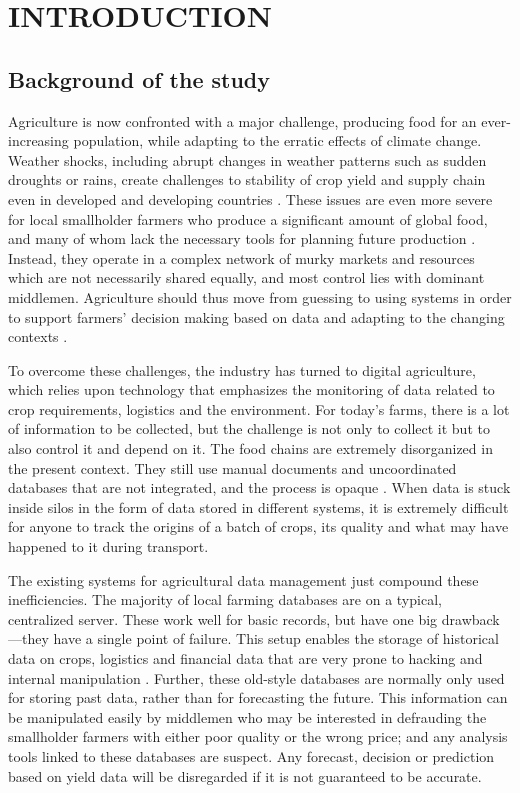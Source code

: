\chapter{INTRODUCTION}

\section{Background of the study}

Agriculture is now confronted with a major challenge, producing food for an ever-increasing population, while adapting to the erratic effects of climate change. Weather shocks, including abrupt changes in weather patterns such as sudden droughts or rains, create challenges to stability of crop yield and supply chain even in developed and developing countries \parencite{padhiary2025emerging}. These issues are even more severe for local smallholder farmers who produce a significant amount of global food, and many of whom lack the necessary tools for planning future production \parencite{raj2022survey}. Instead, they operate in a complex network of murky markets and resources which are not necessarily shared equally, and most control lies with dominant middlemen. Agriculture should thus move from guessing to using systems in order to support farmers' decision making based on data and adapting to the changing contexts \parencite{lin2017blockchain}.

To overcome these challenges, the industry has turned to digital agriculture, which relies upon technology that emphasizes the monitoring of data related to crop requirements, logistics and the environment. For today's farms, there is a lot of information to be collected, but the challenge is not only to collect it but to also control it and depend on it. The food chains are extremely disorganized in the present context. They still use manual documents and uncoordinated databases that are not integrated, and the process is opaque \parencite{sharma2023blockchain}. When data is stuck inside silos in the form of data stored in different systems, it is extremely difficult for anyone to track the origins of a batch of crops, its quality and what may have happened to it during transport.

The existing systems for agricultural data management just compound these inefficiencies. The majority of local farming databases are on a typical, centralized server. These work well for basic records, but have one big drawback—they have a single point of failure. This setup enables the storage of historical data on crops, logistics and financial data that are very prone to hacking and internal manipulation \parencite{aliyu2023blockchain}. Further, these old-style databases are normally only used for storing past data, rather than for forecasting the future. This information can be manipulated easily by middlemen who may be interested in defrauding the smallholder farmers with either poor quality or the wrong price; and any analysis tools linked to these databases are suspect. Any forecast, decision or prediction based on yield data will be disregarded if it is not guaranteed to be accurate.

